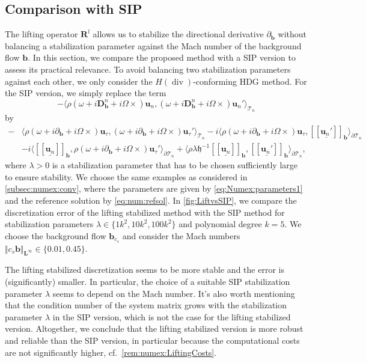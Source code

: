 \documentclass{m2an}
\newcommand{\bflow}{\mathbf{b}}
\newcommand{\angvel}{\Omega}
\newcommand{\conv}{\partial_{\bflow}} %
\newcommand{\opd}{(\omega+i\conv+i\angvel\times)}
\newcommand{\dopd}{(\omega+i\ddiffb+i\angvel\times)}
\renewcommand{\u}{\mathbf{u}}
\renewcommand{\div}{\operatorname{div}}
\newcommand{\calT}{\mathcal{T}}
\newcommand{\bD}{\mathbf{D}}
\newcommand{\bRl}{\mathbf{R}^{\!l}}
\newcommand{\bL}{\mathbf{L}}
\newcommand{\hdgjump}[1]{[\![\underline{#1} ]\!]}
\newcommand{\Tn}{\calT_n}
\newcommand{\spl}{\langle}
\newcommand{\spr}{\rangle}
\newcommand{\diffb}{\partial_{\bflow}}
\newcommand{\ddiffb}{\bD_{\bflow}^n}
\newcommand{\h}{\mathfrak{h}}
\theoremstyle{plain}
\theoremstyle{definition}
\begin{document}
\subsection{Comparison with SIP}\label{subsec:numex:SIP}
The lifting operator $\bRl$ allows us to stabilize the directional derivative $\diffb$ without balancing a stabilization parameter against the Mach number of the background flow $\bflow$. In this section, we compare the proposed method with a SIP version to assess its practical relevance. To avoid balancing two stabilization parameters against each other, we only consider the $H(\div)$-conforming HDG method. For the SIP version, we simply replace the term 
\begin{equation*}
   - \spl \rho \dopd \u_n, \dopd \u_n' \spr_{\Tn}
\end{equation*}
by
\begin{align*}
   - &\spl \rho \opd \u_{\tau}, \opd \u_{\tau}' \spr_{\Tn} - i \spl \rho \opd \u_{\tau}, \hdgjump{\u_n'}_{\bflow} \spr_{\partial \Tn} \\
   &- i \spl \hdgjump{\u_n}_{\bflow}, \rho \opd \u_{\tau}' \spr_{\partial \Tn} + \spl \rho \lambda \h^{-1} \hdgjump{\u_n}_{\bflow}, \hdgjump{\u_n'}_{\bflow} \spr_{\partial \Tn},
\end{align*}
where $\lambda > 0$ is a stabilization parameter that has to be chosen sufficiently large to ensure stability. We choose the same examples as considered in \cref{subsec:numex:conv}, where the parameters are given by \eqref{eq:Numex:parameters1} and the reference solution by \eqref{eq:num:refsol}. In \cref{fig:LiftvsSIP}, we compare the discretization error of the lifting stabilized method with the SIP method for stabilization parameters $\lambda \in \{1k^2,10k^2,100k^2\}$ and polynomial degree $k = 5$. We choose the background flow $\bflow_{c_s}$ and consider the Mach numbers $\Vert c_s \bflow \Vert_{\bL^\infty} \in \{0.01,0.45\}$. 

The lifting stabilized discretization seems to be more stable and the error is (significantly) smaller. In particular, the choice of a suitable SIP stabilization parameter $\lambda$ seems to depend on the Mach number. It's also worth mentioning that the condition number of the system matrix grows with the stabilization parameter $\lambda$ in the SIP version, which is not the case for the lifting stabilized version. 
Altogether, we conclude that the lifting stabilized version is more robust and reliable than the SIP version, in particular because the computational costs are not significantly higher, cf.~\cref{rem:numex:LiftingCosts}.
\end{document}
